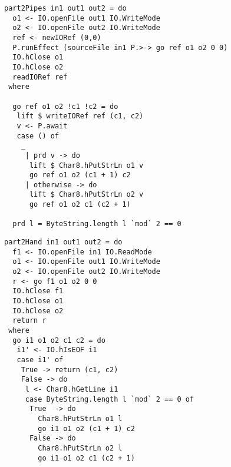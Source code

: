 % 
% 

\begin{lstlisting}[float=ht,label=l:a:bench:part2Pipes,caption=Pipes implementation of \Hs/part2/]
part2Pipes in1 out1 out2 = do
  o1 <- IO.openFile out1 IO.WriteMode
  o2 <- IO.openFile out2 IO.WriteMode
  ref <- newIORef (0,0)
  P.runEffect (sourceFile in1 P.>-> go ref o1 o2 0 0)
  IO.hClose o1
  IO.hClose o2
  readIORef ref
 where

  go ref o1 o2 !c1 !c2 = do
   lift $ writeIORef ref (c1, c2)
   v <- P.await
   case () of
    _
     | prd v -> do
      lift $ Char8.hPutStrLn o1 v
      go ref o1 o2 (c1 + 1) c2
     | otherwise -> do
      lift $ Char8.hPutStrLn o2 v
      go ref o1 o2 c1 (c2 + 1)

  prd l = ByteString.length l `mod` 2 == 0
\end{lstlisting}

\begin{lstlisting}[float=ht,label=l:a:bench:part2Hand,caption=Hand implementation of \Hs/part2/]
part2Hand in1 out1 out2 = do
  f1 <- IO.openFile in1 IO.ReadMode
  o1 <- IO.openFile out1 IO.WriteMode
  o2 <- IO.openFile out2 IO.WriteMode
  r <- go f1 o1 o2 0 0
  IO.hClose f1
  IO.hClose o1
  IO.hClose o2
  return r
 where
  go i1 o1 o2 c1 c2 = do
   i1' <- IO.hIsEOF i1
   case i1' of
    True -> return (c1, c2)
    False -> do
     l <- Char8.hGetLine i1
     case ByteString.length l `mod` 2 == 0 of
      True  -> do
        Char8.hPutStrLn o1 l
        go i1 o1 o2 (c1 + 1) c2
      False -> do
        Char8.hPutStrLn o2 l
        go i1 o1 o2 c1 (c2 + 1)
\end{lstlisting}

